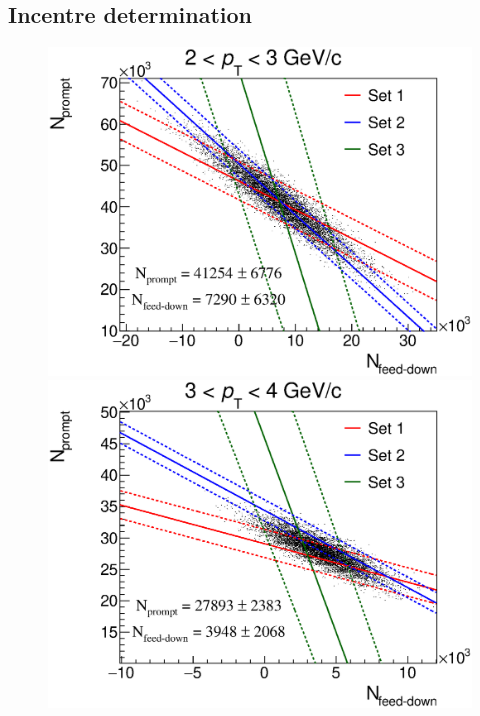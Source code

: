 \documentclass[b5paper,10pt,twoside,oldstyle,classica]{toptesi}
\begin{document}
\subsection{Incentre determination}
\begin{figure}[h]
\begin{center}
{\includegraphics[scale = 0.25]{LinesDisp_2-3.eps}}
\hspace{0cm}
{\includegraphics[scale = 0.25]{LinesDisp_3-4.eps}}
\vspace{0cm}

\end{center}
\end{figure}
\end{document}
